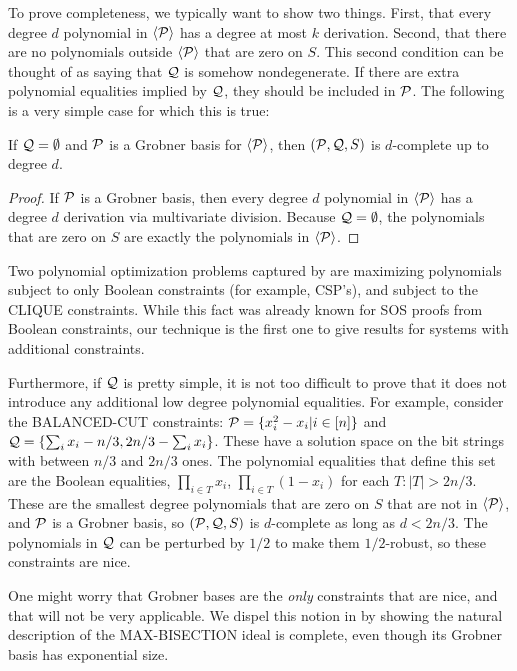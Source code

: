 To prove completeness, we typically want to show two things. First, that every degree $d$ polynomial in $\langle \mathcal P\rangle$ has a degree at most $k$ derivation. Second, that there are no polynomials outside $\langle \mathcal P\rangle$ that are zero on $S$. This second condition can be thought of as saying that $\mathcal Q$ is somehow nondegenerate. If there are extra polynomial equalities implied by $\mathcal Q$, they should be included in $\mathcal P$. The following is a very simple case for which this is true:
\begin{lemma}\label{lem:grobner}
If $\mathcal Q = \emptyset$ and $\mathcal P$ is a Grobner basis for $\langle \mathcal P\rangle$, then $(\mathcal P,\mathcal Q,S)$ is $d$-complete up to degree $d$. 
\end{lemma}
\begin{proof}
If $\mathcal P$ is a Grobner basis, then every degree $d$ polynomial in $\langle \mathcal P\rangle$ has a degree $d$ derivation via multivariate division. Because $\mathcal Q = \emptyset$, the polynomials that are zero on $S$ are exactly the polynomials in $\langle \mathcal P\rangle$. 
\end{proof}
Two polynomial optimization problems captured by  are maximizing polynomials subject to only Boolean constraints (for example, CSP's), and subject to the CLIQUE constraints. While this fact was already known for SOS proofs from Boolean constraints, our technique is the first one to give results for systems with additional constraints. 

Furthermore, if $\mathcal Q$ is pretty simple, it is not too difficult to prove that it does not introduce any additional low degree polynomial equalities. For example, consider the BALANCED-CUT constraints: $\mathcal P = \{x_i^2-x_i | i \in [n]\}$ and $\mathcal Q = \{\sum_i x_i - n/3, 2n/3 - \sum_i x_i\}$. These have a solution space on the bit strings with between $n/3$ and $2n/3$ ones. The polynomial equalities that define this set are the Boolean equalities, $\prod_{i \in T} x_i$, $\prod_{i \in T} (1-x_i)$ for each $T: |T| > 2n/3$. These are the smallest degree polynomials that are zero on $S$ that are not in $\langle \mathcal P\rangle$, and $\mathcal P$ is a Grobner basis, so $(\mathcal P, \mathcal Q, S)$ is $d$-complete as long as $d < 2n/3$. The polynomials in $\mathcal Q$ can be perturbed by $1/2$ to make them $1/2$-robust, so these constraints are nice. 

One might worry that Grobner bases are the \emph{only} constraints that are nice, and that  will not be very applicable. We dispel this notion in  by showing the natural description of the MAX-BISECTION ideal is complete, even though its Grobner basis has exponential size.

